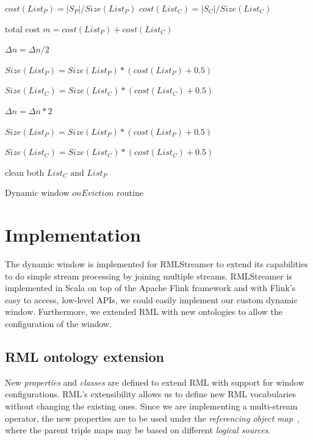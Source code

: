 \begin{algorithm}[htbp]
    \DontPrintSemicolon

    $cost(List_P) = |S_P| / Size(List_P)$       
    $cost(List_C) = |S_C| / Size(List_C)$       


    total cost $ m = cost(List_P) + cost(List_C)$  
  
    {
        $\Delta n = \Delta n / 2 $ 
        
        $Size(List_P) = Size(List_P) * (cost(List_P) + 0.5)$  

        $Size(List_C) = Size(List_C) * (cost(List_C) + 0.5)$  
    }
    {
        $\Delta n = \Delta n * 2$ 

        $Size(List_P) = Size(List_P) * (cost(List_P) + 0.5)$  

        $Size(List_C) = Size(List_C) * (cost(List_C) + 0.5)$  
    }

    clean both $List_C \text{ and } List_P$
    \caption{Dynamic window $onEviction$ routine}
    \label{alg:dynamic_eviction}
\end{algorithm}



\section{Implementation}%
\label{sec:Implementation}

The dynamic window is implemented for RMLStreamer 
to extend its capabilities to do simple stream processing by 
joining multiple streams. RMLStreamer is implemented in Scala 
on top of the Apache Flink framework and with Flink's easy to access, low-level APIs, 
we could easily implement our custom dynamic window. Furthermore, we extended RML
with new ontologies to allow the configuration of the window. 

\subsection{RML ontology extension}
New \emph{properties} and \emph{classes} are defined to extend 
RML with 
support for window configurations. RML's extensibility allows us to 
define new RML vocabularies without changing the existing ones. Since
we are implementing a multi-stream operator, the new properties are 
to be used under the \emph{referencing object map}~\cite{rml_tech},
where the parent triple maps may be based on 
different \emph{logical sources}.

